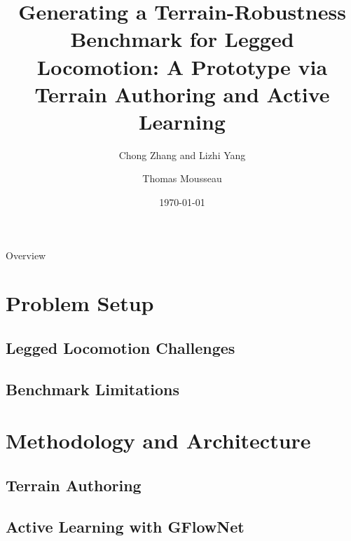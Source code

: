 \documentclass[aspectratio=169,xcolor=dvipsnames]{beamer}
\title{Generating a Terrain-Robustness Benchmark for Legged Locomotion:
A Prototype via Terrain Authoring and Active Learning}
\subtitle{Chong Zhang and Lizhi Yang}
\author{Thomas Mousseau}
\date{\today} %
\begin{document}
\begin{frame}
    \vspace*{-2cm}
    \titlepage
\end{frame}

\begin{frame}{Overview}
    \tableofcontents
\end{frame}

\section{Problem Setup}

\subsection{Legged Locomotion Challenges}

\subsection{Benchmark Limitations}

\section{Methodology and Architecture}

\subsection{Terrain Authoring}

\subsection{Active Learning with GFlowNet}
\end{document}
